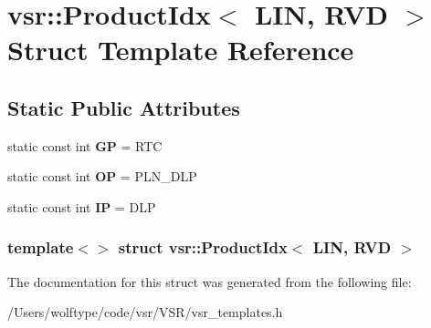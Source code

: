\hypertarget{structvsr_1_1_product_idx_3_01_l_i_n_00_01_r_v_d_01_4}{\section{vsr\-:\-:Product\-Idx$<$ L\-I\-N, R\-V\-D $>$ Struct Template Reference}
\label{structvsr_1_1_product_idx_3_01_l_i_n_00_01_r_v_d_01_4}
}
\subsection*{Static Public Attributes}
\begin{DoxyCompactItemize}
\item 
\hypertarget{structvsr_1_1_product_idx_3_01_l_i_n_00_01_r_v_d_01_4_aa01cb0795b7c0d3ea1dfa4a5fcd9ff15}{static const int {\bfseries G\-P} = R\-T\-C}\label{structvsr_1_1_product_idx_3_01_l_i_n_00_01_r_v_d_01_4_aa01cb0795b7c0d3ea1dfa4a5fcd9ff15}

\item 
\hypertarget{structvsr_1_1_product_idx_3_01_l_i_n_00_01_r_v_d_01_4_a01f2be08518c85ecec1263e8a58c1cd3}{static const int {\bfseries O\-P} = P\-L\-N\-\_\-\-D\-L\-P}\label{structvsr_1_1_product_idx_3_01_l_i_n_00_01_r_v_d_01_4_a01f2be08518c85ecec1263e8a58c1cd3}

\item 
\hypertarget{structvsr_1_1_product_idx_3_01_l_i_n_00_01_r_v_d_01_4_a36a4d2bc02dac6498232e27c2fa64309}{static const int {\bfseries I\-P} = D\-L\-P}\label{structvsr_1_1_product_idx_3_01_l_i_n_00_01_r_v_d_01_4_a36a4d2bc02dac6498232e27c2fa64309}

\end{DoxyCompactItemize}
\subsubsection*{template$<$$>$ struct vsr\-::\-Product\-Idx$<$ L\-I\-N, R\-V\-D $>$}



The documentation for this struct was generated from the following file\-:\begin{DoxyCompactItemize}
\item 
/\-Users/wolftype/code/vsr/\-V\-S\-R/vsr\-\_\-templates.\-h\end{DoxyCompactItemize}
